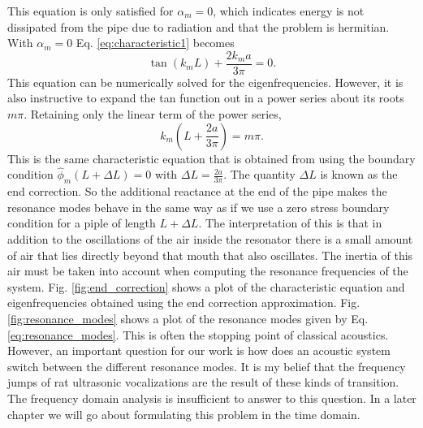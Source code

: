 \documentclass[12pt, letter]{report}
\begin{document}
This equation is only satisfied for $\alpha_m=0$, which indicates energy is not dissipated from the pipe due to radiation and that the problem is hermitian. With $\alpha_m=0$ Eq. \ref{eq:characteristic1} becomes 
\begin{equation}
\label{eq:characteristic}
\tan \left( k_m L \right) + \frac{2 k_m a}{3 \pi} = 0.
\end{equation}
This equation can be numerically solved for the eigenfrequencies. However, it is also instructive to expand the tan function out in a power series about its roots $m \pi$. Retaining only the linear term of the power series,
\begin{equation}
\label{eq:end_correction}
k_m \left( L + \frac{2 a}{3 \pi} \right) = m \pi.
\end{equation}
This is the same characteristic equation that is obtained from using the boundary condition $\hat{\phi}_m(L + \Delta L) = 0$ with $\Delta L = \frac{2 a}{3 \pi}$. The quantity $\Delta L$ is known as the end correction. So the additional reactance at the end of the pipe makes the resonance modes behave in the same way as if we use a zero stress boundary condition for a piple of length $L + \Delta L$. The interpretation of this is that in addition to the oscillations of the air inside the resonator there is a small amount of air that lies directly beyond that mouth that also oscillates. The inertia of this air must be taken into account when computing the resonance frequencies of the system. Fig. \ref{fig:end_correction} shows a plot of the characteristic equation and eigenfrequencies obtained using the end correction approximation. Fig. \ref{fig:resonance_modes} shows a plot of the resonance modes given by Eq. \ref{eq:resonance_modes}. This is often the stopping point of classical acoustics. However, an important question for our work is how does an acoustic system switch between the different resonance modes. It is my belief that the frequency jumps of rat ultrasonic vocalizations are the result of these kinds of transition. The frequency domain analysis is insufficient to answer to this question. In a later chapter we will go about formulating this problem in the time domain.
\end{document}
